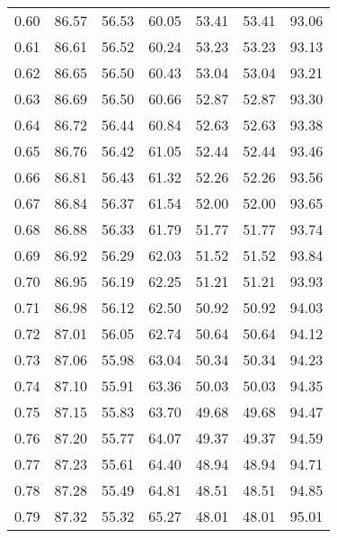 \begin{tabular}{|c|c|c|c|c|c|c|}
      0.60 &     86.57 &     56.53 &      60.05 &   53.41 &      53.41 &         93.06 \\
      0.61 &     86.61 &     56.52 &      60.24 &   53.23 &      53.23 &         93.13 \\
      0.62 &     86.65 &     56.50 &      60.43 &   53.04 &      53.04 &         93.21 \\
      0.63 &     86.69 &     56.50 &      60.66 &   52.87 &      52.87 &         93.30 \\
      0.64 &     86.72 &     56.44 &      60.84 &   52.63 &      52.63 &         93.38 \\
      0.65 &     86.76 &     56.42 &      61.05 &   52.44 &      52.44 &         93.46 \\
      0.66 &     86.81 &     56.43 &      61.32 &   52.26 &      52.26 &         93.56 \\
      0.67 &     86.84 &     56.37 &      61.54 &   52.00 &      52.00 &         93.65 \\
      0.68 &     86.88 &     56.33 &      61.79 &   51.77 &      51.77 &         93.74 \\
      0.69 &     86.92 &     56.29 &      62.03 &   51.52 &      51.52 &         93.84 \\
      0.70 &     86.95 &     56.19 &      62.25 &   51.21 &      51.21 &         93.93 \\
      0.71 &     86.98 &     56.12 &      62.50 &   50.92 &      50.92 &         94.03 \\
      0.72 &     87.01 &     56.05 &      62.74 &   50.64 &      50.64 &         94.12 \\
      0.73 &     87.06 &     55.98 &      63.04 &   50.34 &      50.34 &         94.23 \\
      0.74 &     87.10 &     55.91 &      63.36 &   50.03 &      50.03 &         94.35 \\
      0.75 &     87.15 &     55.83 &      63.70 &   49.68 &      49.68 &         94.47 \\
      0.76 &     87.20 &     55.77 &      64.07 &   49.37 &      49.37 &         94.59 \\
      0.77 &     87.23 &     55.61 &      64.40 &   48.94 &      48.94 &         94.71 \\
      0.78 &     87.28 &     55.49 &      64.81 &   48.51 &      48.51 &         94.85 \\
      0.79 &     87.32 &     55.32 &      65.27 &   48.01 &      48.01 &         95.01 \\

\end{tabular}
